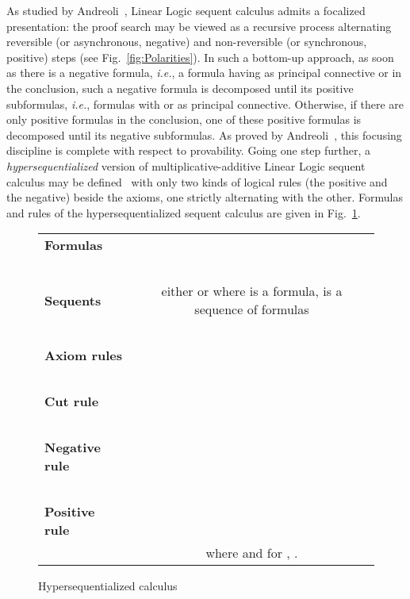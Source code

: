 \documentclass{LMCS}
\def\ie{{\em i.e.}}
\begin{document}
As studied by Andreoli~\cite{DBLP:journals/logcom/Andreoli92}, Linear Logic sequent calculus admits a focalized presentation:
the proof search may be viewed as a recursive process alternating reversible (or asynchronous, negative) and non-reversible (or synchronous, positive) steps (see Fig.~\ref{fig:Polarities}). 
In such a bottom-up approach, as soon as there is a negative formula, \ie, a formula having as principal connective  or  in the conclusion, such a negative formula is decomposed until its positive subformulas, \ie, formulas with 
 or  as principal connective. Otherwise, if there are only positive formulas in the conclusion, one of these positive formulas is decomposed until its negative subformulas. As proved by Andreoli~\cite{DBLP:journals/logcom/Andreoli92}, this focusing discipline is complete with respect to provability.
Going one step further, a {\em hypersequentialized} version of multiplicative-additive Linear Logic sequent calculus may be defined~\cite{DBLP:journals/logcom/Andreoli92,girard00,DBLP:journals/iandc/CurienF12} with only  two kinds of logical rules (the positive and the negative) beside the axioms, one strictly alternating with the other.
Formulas  and rules of the hypersequentialized sequent calculus are given in Fig.~\ref{fig:HScalculus}.

\begin{figure}
\renewcommand{\tabularxcolumn}[1]{>{\centering\arraybackslash}m{#1}}
\begin{tabularx}{\textwidth}{lXXX}
{\bf Formulas} & 
\multicolumn{3}{c}{}
 \\
~\\
{\bf Sequents} & 
\multicolumn{3}{c}{
either  or  where  is a formula,  is a sequence of formulas
}
 \\
~
\\
{\bf Axiom rules}
&

&

&

\\
~
\\
{\bf Cut rule}
&
\multicolumn{3}{c}{}
\\
~
\\
{\bf Negative rule}
&
\multicolumn{3}{c}{

}
\\
~
\\
{\bf Positive rule}
&
\multicolumn{3}{c}{

}
\\
&
\multicolumn{3}{c}{
where  and for , .
}
\end{tabularx}
\caption{Hypersequentialized calculus}
\label{fig:HScalculus}
\end{figure}
\end{document}
